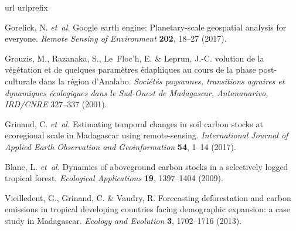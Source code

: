 \documentclass[
  12pt,
]{article}
\begin{document}
\begin{thebibliography}{99}
\expandafter\ifx\csname url\endcsname\relax
  \def\url#1{\texttt{#1}}\fi
\expandafter\ifx\csname urlprefix\endcsname\relax\def\urlprefix{URL }\fi
\providecommand{\bibinfo}[2]{#2}
\providecommand{\eprint}[2][]{\url{#2}}

\bibinfo{author}{Gorelick, N.} \emph{et~al.}
\newblock \bibinfo{title}{Google earth engine: Planetary-scale geospatial
  analysis for everyone}.
\newblock \emph{\bibinfo{journal}{Remote Sensing of Environment}}
  \textbf{\bibinfo{volume}{202}}, \bibinfo{pages}{18--27}
  (\bibinfo{year}{2017}).

\bibinfo{author}{Grouzis, M.}, \bibinfo{author}{Razanaka, S.},
  \bibinfo{author}{Le~Floc’h, E.} \& \bibinfo{author}{Leprun, J.-C.}
\newblock \bibinfo{title}{{\'E}volution de la v{\'e}g{\'e}tation et de quelques
  param{\`e}tres {\'e}daphiques au cours de la phase post-culturale dans la
  r{\'e}gion d’{A}nalabo}.
\newblock \emph{\bibinfo{journal}{Soci{\'e}t{\'e}s paysannes, transitions
  agraires et dynamiques {\'e}cologiques dans le Sud-Ouest de Madagascar,
  Antananarivo, IRD/CNRE}} \bibinfo{pages}{327--337} (\bibinfo{year}{2001}).

\bibinfo{author}{Grinand, C.} \emph{et~al.}
\newblock \bibinfo{title}{Estimating temporal changes in soil carbon stocks at
  ecoregional scale in {M}adagascar using remote-sensing}.
\newblock \emph{\bibinfo{journal}{International Journal of Applied Earth
  Observation and Geoinformation}} \textbf{\bibinfo{volume}{54}},
  \bibinfo{pages}{1--14} (\bibinfo{year}{2017}).

\bibinfo{author}{Blanc, L.} \emph{et~al.}
\newblock \bibinfo{title}{Dynamics of aboveground carbon stocks in a
  selectively logged tropical forest}.
\newblock \emph{\bibinfo{journal}{Ecological Applications}}
  \textbf{\bibinfo{volume}{19}}, \bibinfo{pages}{1397--1404}
  (\bibinfo{year}{2009}).

\bibinfo{author}{Vieilledent, G.}, \bibinfo{author}{Grinand, C.} \&
  \bibinfo{author}{Vaudry, R.}
\newblock \bibinfo{title}{Forecasting deforestation and carbon emissions in
  tropical developing countries facing demographic expansion: a case study in
  {M}adagascar}.
\newblock \emph{\bibinfo{journal}{Ecology and Evolution}}
  \textbf{\bibinfo{volume}{3}}, \bibinfo{pages}{1702--1716}
  (\bibinfo{year}{2013}).


\end{thebibliography}
\end{document}
